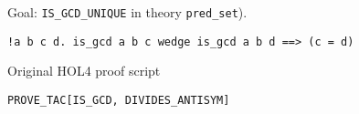 \documentclass[runningheads,a4paper,draft]{svjour3}
\def\holfour{\textsf{HOL4}\xspace}
\begin{document}





%

Goal: \texttt{IS\_GCD\_UNIQUE} in theory \texttt{pred\_set}).
\begin{lstlisting}[language=SMLSmall,frame=tb]
!a b c d. is_gcd a b c wedge is_gcd a b d ==> (c = d)
\end{lstlisting}

Original \holfour proof script
\begin{lstlisting}[language=SMLSmall,frame=tb]
PROVE_TAC[IS_GCD, DIVIDES_ANTISYM]
\end{lstlisting}
\end{document}
